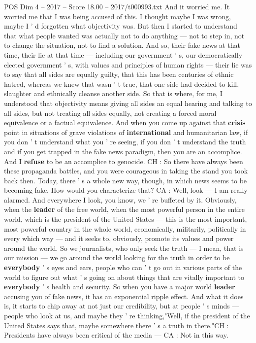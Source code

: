 \begin{textsample}{POS Dim 4 – 2017 – Score 18.00 – 2017/t000993.txt}
And it worried me.
It worried me that I was being accused of this.
I thought maybe I was wrong, maybe I ' d forgotten what objectivity was.
But then I started to understand that what people wanted was actually not to do anything — not to step in, not to change the situation, not to find a solution.
And so, their fake news at that time, their lie at that time — including our government ' s, our democratically elected government ' s, with values and principles of human rights — their lie was to say that all sides are equally guilty, that this has been centuries of ethnic hatred, whereas we knew that wasn ' t true, that one side had decided to kill, slaughter and ethnically cleanse another side.
So that is where, for me, I understood that objectivity means giving all sides an equal hearing and talking to all sides, but not treating all sides equally, not creating a forced moral equivalence or a factual equivalence.
And when you come up against that \textbf{crisis} point in situations of grave violations of \textbf{international} and humanitarian law, if you don ' t understand what you ' re seeing, if you don ' t understand the truth and if you get trapped in the fake news paradigm, then you are an accomplice.
And I \textbf{refuse} to be an accomplice to genocide.
CH : So there have always been these propaganda battles, and you were courageous in taking the stand you took back then.
Today, there ' s a whole new way, though, in which news seems to be becoming fake.
How would you characterize that?
CA : Well, look — I am really alarmed.
And everywhere I look, you know, we ' re buffeted by it.
Obviously, when the \textbf{leader} of the free world, when the most powerful person in the entire world, which is the president of the United States — this is the most important, most powerful country in the whole world, economically, militarily, politically in every which way — and it seeks to, obviously, promote its values and power around the world.
So we journalists, who only seek the truth — I mean, that is our mission — we go around the world looking for the truth in order to be \textbf{everybody} ' s eyes and ears, people who can ' t go out in various parts of the world to figure out what ' s going on about things that are vitally important to \textbf{everybody} ' s health and security.
So when you have a major world \textbf{leader} accusing you of fake news, it has an exponential ripple effect.
And what it does is, it starts to chip away at not just our credibility, but at people ' s minds — people who look at us, and maybe they ' re thinking,"Well, if the president of the United States says that, maybe somewhere there ' s a truth in there."CH : Presidents have always been critical of the media — CA : Not in this way.

\end{textsample}
